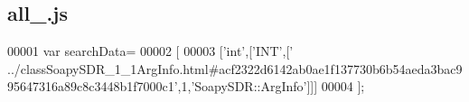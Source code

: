 \subsection{all\+\_.\+js}
\label{all__8_8js_source}

\begin{DoxyCode}
00001 var searchData=
00002 [
00003   [\textcolor{stringliteral}{'int'},[\textcolor{stringliteral}{'INT'},[\textcolor{stringliteral}{'
      ../classSoapySDR\_1\_1ArgInfo.html#acf2322d6142ab0ae1f137730b6b54aeda3bac995647316a89c8c3448b1f7000c1'},1,\textcolor{stringliteral}{'SoapySDR::ArgInfo'}]]]
00004 ];
\end{DoxyCode}
